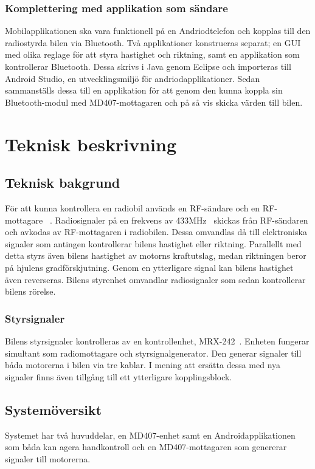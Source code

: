 \documentclass[a4paper]{article}
\begin{document}
\subsubsection{Komplettering med applikation som sändare}
\vspace{5mm} \noindent
Mobilapplikationen ska vara funktionell på en Andriodtelefon och kopplas till den radiostyrda bilen via Bluetooth. Två applikationer konstrueras separat; en GUI med olika reglage för att styra hastighet och riktning, samt en applikation som kontrollerar Bluetooth. Dessa skrivs i Java genom Eclipse och importeras till Android Studio, en utvecklingsmiljö för andriodapplikationer. Sedan sammanställs dessa till en applikation för att genom den kunna koppla sin Bluetooth-modul med MD407-mottagaren och på så vis skicka värden till bilen.

\newpage
\section{Teknisk beskrivning}

\subsection{Teknisk bakgrund}
För att kunna kontrollera en radiobil används en RF-sändare och en RF-mottagare ~\cite{RCTechnique}. Radiosignaler på en frekvens av 433MHz~\cite{RFModule} skickas från RF-sändaren och avkodas av RF-mottagaren i radiobilen. Dessa omvandlas då till elektroniska signaler som antingen kontrollerar bilens hastighet eller riktning. Parallellt med detta styrs även bilens hastighet av motorns kraftutslag, medan riktningen beror på hjulens gradförskjutning. Genom en ytterligare signal kan bilens hastighet även reverseras. Bilens styrenhet omvandlar radiosignaler som sedan kontrollerar bilens rörelse.

\subsubsection{Styrsignaler}
Bilens styrsignaler kontrolleras av en kontrollenhet, MRX-242~\cite{projektDir}. Enheten fungerar simultant som radiomottagare och styrsignalgenerator. Den generar signaler till båda motorerna i bilen via tre kablar. I mening att ersätta dessa med nya signaler finns även tillgång till ett ytterligare kopplingsblock.


\subsection{Systemöversikt}
Systemet har två huvuddelar, en MD407-enhet samt en Androidapplikationen som båda kan agera handkontroll och en MD407-mottagaren som genererar signaler till motorerna.
\end{document}
